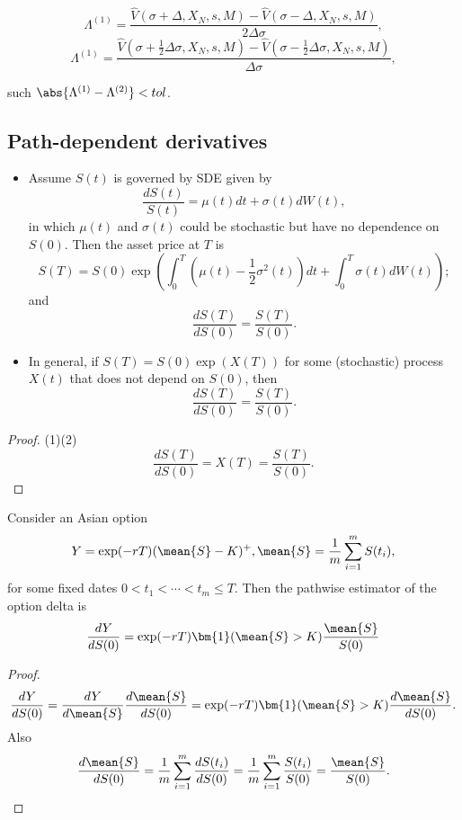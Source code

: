 \begin{refsection}
\begin{method}
	
	$$\Lambda^{(1)} = \frac{\hat{V}(\sigma+\Delta, X_N, s, M) - \hat{V}(\sigma-\Delta, X_N, s, M) }{2\Delta \sigma},$$
	$$\Lambda^{(1)} = \frac{\hat{V}(\sigma+\frac{1}{2}\Delta \sigma, X_N, s, M) - \hat{V}(\sigma-\frac{1}{2}\Delta \sigma, X_N, s, M) }{\Delta \sigma},$$
	
	such $\abs{\Lambda^{(1)} - \Lambda^{(2)}} < tol$.
\end{method}



\subsection{Path-dependent derivatives}

\begin{lemma}\cite[391]{glasserman2003monte}
\begin{itemize}
	\item Assume $S(t)$ is governed by SDE given by
	$$\frac{dS(t)}{S(t)} = \mu(t)dt + \sigma(t)dW(t),$$
	in which $\mu(t)$ and $\sigma(t)$ could be stochastic but have no dependence on $S(0)$. Then the asset price at $T$ is
	$$S(T) = S(0)\exp(\int_{0}^{T}(\mu(t)-\frac{1}{2}\sigma^2(t))dt + \int_0^T\sigma(t)dW(t));$$
	and
	$$\frac{dS(T)}{dS(0)} = \frac{S(T)}{S(0)}.$$
	\item In general, if $S(T) = S(0)\exp(X(T))$ for some (stochastic) process $X(t)$ that does not depend on $S(0)$, then
	$$\frac{dS(T)}{dS(0)} = \frac{S(T)}{S(0)}.$$
\end{itemize}	
\end{lemma}
\begin{proof}
(1)(2) $$\frac{dS(T)}{dS(0)}=X(T) = \frac{S(T)}{S(0)}.$$
\end{proof}


\begin{lemma}\cite[389]{glasserman2003monte}
Consider an Asian option 
$$Y = \exp(-rT)(\mean{S} - K)^+, \mean{S} = \frac{1}{m}\sum_{i=1}^m S(t_i),$$
for some fixed dates $0 < t_1 < \cdots < t_m \leq T$.
Then the pathwise estimator of the option delta is
$$\frac{dY}{dS(0)} = \exp(-rT)\bm{1}(\mean{S}>K)\frac{\mean{S}}{S(0)}$$	
\end{lemma}
\begin{proof}
$$\frac{dY}{dS(0)} = \frac{dY}{d\mean{S}}\frac{d\mean{S}}{dS(0)} = \exp(-rT)\bm{1}(\mean{S}>K)\frac{d\mean{S}}{dS(0)}.$$
Also
$$\frac{d\mean{S}}{dS(0)} = \frac{1}{m}\sum_{i=1}^m \frac{dS(t_i)}{dS(0)} = \frac{1}{m}\sum_{i=1}^m \frac{S(t_i)}{S(0)} = \frac{\mean{S}}{S(0)}.$$


\end{proof}
\end{refsection}

